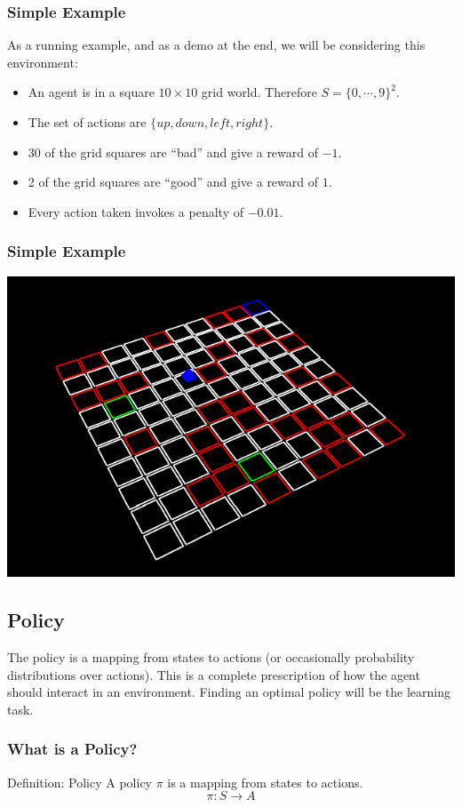 \documentclass[ignorenonframetext]{beamer}
\begin{document}
\begin{frame}
	\frametitle{Simple Example}
	\begin{block}{ As a running example, and as a demo at the end, we
		will be considering this environment:}
		\begin{itemize}
			\item An agent is in a square $10\times 10$ grid world.  Therefore $S =
				\{0,\cdots,9\}^2$.  
			\item The set of actions are $\{up, down, left,
				right\}$.  
			\item 30 of the grid squares are ``bad'' and give a reward
				of $-1$.  
			\item2 of the grid squares are ``good'' and give a reward of
				$1$.  
			\item Every action taken invokes a penalty of $-0.01$.
		\end{itemize}
	\end{block}
\end{frame}

\begin{frame}
	\frametitle{Simple Example}
	\includegraphics[scale=0.5]{example.png}
\end{frame}
\subsection{Policy}

The policy is a mapping from states to actions (or occasionally
probability distributions over actions).  This is a complete
prescription of how the agent should interact in an environment.
Finding an optimal policy will be the learning task.

\begin{frame}
	\frametitle{What is a Policy?}
	\begin{block}{Definition: Policy}
		A policy $\pi$ is a mapping from states to actions.
		\[ \pi: S \rightarrow A \]
	\end{block}
\end{frame}
\end{document}
